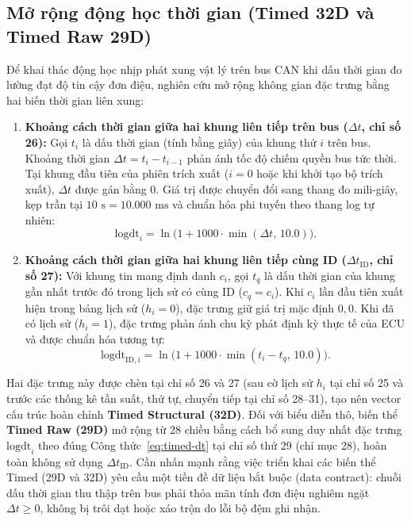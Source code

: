 \documentclass[12pt, a4paper, reqno, oneside]{book}
\begin{document}
\subsection{Mở rộng động học thời gian (Timed 32D và Timed Raw 29D)}\label{subsec:timed-features-def}
Để khai thác động học nhịp phát xung vật lý trên bus CAN khi dấu thời gian đo lường đạt độ tin cậy đơn điệu, nghiên cứu mở rộng không gian đặc trưng bằng hai biến thời gian liên xung:
\begin{enumerate}
    \item \textbf{Khoảng cách thời gian giữa hai khung liên tiếp trên bus ($\Delta t$, chỉ số 26):} Gọi $t_i$ là dấu thời gian (tính bằng giây) của khung thứ $i$ trên bus. Khoảng thời gian $\Delta t = t_i - t_{i-1}$ phản ánh tốc độ chiếm quyền bus tức thời. Tại khung đầu tiên của phiên trích xuất ($i=0$ hoặc khi khởi tạo bộ trích xuất), $\Delta t$ được gán bằng $0$. Giá trị được chuyển đổi sang thang đo mili-giây, kẹp trần tại $10\text{ s} = 10.000\text{ ms}$ và chuẩn hóa phi tuyến theo thang log tự nhiên:
    \begin{equation}\label{eq:timed-dt}
    \text{logdt}_i = \ln\big(1 + 1000 \cdot \min(\Delta t,\, 10.0)\big).
    \end{equation}
    \item \textbf{Khoảng cách thời gian giữa hai khung liên tiếp cùng ID ($\Delta t_{\text{ID}}$, chỉ số 27):} Với khung tin mang định danh $c_i$, gọi $t_q$ là dấu thời gian của khung gần nhất trước đó trong lịch sử có cùng ID ($c_q = c_i$). Khi $c_i$ lần đầu tiên xuất hiện trong bảng lịch sử ($h_i = 0$), đặc trưng giữ giá trị mặc định $0{,}0$. Khi đã có lịch sử ($h_i = 1$), đặc trưng phản ánh chu kỳ phát định kỳ thực tế của ECU và được chuẩn hóa tương tự:
    \begin{equation}\label{eq:timed-dt-id}
    \text{logdt}_{\text{ID}, i} = \ln\big(1 + 1000 \cdot \min(t_i - t_q,\, 10.0)\big).
    \end{equation}
\end{enumerate}
Hai đặc trưng này được chèn tại chỉ số 26 và 27 (sau cờ lịch sử $h_i$ tại chỉ số 25 và trước các thống kê tần suất, thứ tự, chuyển tiếp tại chỉ số 28--31), tạo nên vector cấu trúc hoàn chỉnh \textbf{Timed Structural (32D)}. Đối với biểu diễn thô, biến thể \textbf{Timed Raw (29D)} mở rộng từ 28 chiều bằng cách bổ sung duy nhất đặc trưng $\text{logdt}_i$ theo đúng Công thức~\eqref{eq:timed-dt} tại chỉ số thứ 29 (chỉ mục 28), hoàn toàn không sử dụng $\Delta t_{\text{ID}}$. Cần nhấn mạnh rằng việc triển khai các biến thể Timed (29D và 32D) yêu cầu một tiền đề dữ liệu bắt buộc (data contract): chuỗi dấu thời gian thu thập trên bus phải thỏa mãn tính đơn điệu nghiêm ngặt $\Delta t \ge 0$, không bị trôi dạt hoặc xáo trộn do lỗi bộ đệm ghi nhận.
\end{document}
